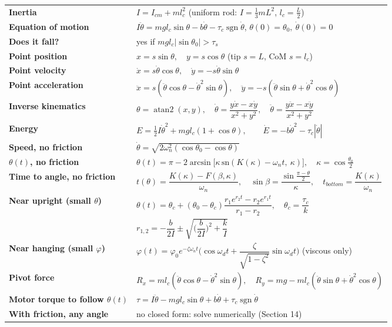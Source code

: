 \documentclass[11pt]{article}
\newcommand{\sgn}{\operatorname{sgn}}
\begin{document}
\begin{tabular}{@{}>{\raggedright\arraybackslash}p{1.35in}l@{}}
\textbf{Inertia} & $I = I_{cm} + m l_c^2$ \qquad (uniform rod: $I=\tfrac13 mL^2$, $l_c=\tfrac L2$)\\
\textbf{Equation of motion} & $I\ddot\theta = m g l_c\sin\theta - b\dot\theta - \tau_c\sgn\dot\theta$, \quad $\theta(0)=\theta_0,\ \dot\theta(0)=0$\\
\textbf{Does it fall?} & yes if $m g l_c|\sin\theta_0| > \tau_s$\\
\textbf{Point position} & $x = s\sin\theta,\quad y = s\cos\theta$ \qquad (tip $s=L$, CoM $s=l_c$)\\
\textbf{Point velocity} & $\dot x = s\dot\theta\cos\theta,\quad \dot y = -s\dot\theta\sin\theta$\\
\textbf{Point acceleration} & $\ddot x = s(\ddot\theta\cos\theta-\dot\theta^2\sin\theta),\quad \ddot y = -s(\ddot\theta\sin\theta+\dot\theta^2\cos\theta)$\\
\textbf{Inverse kinematics} & $\theta=\operatorname{atan2}(x,y),\quad \dot\theta=\dfrac{y\dot x-x\dot y}{x^2+y^2},\quad \ddot\theta=\dfrac{y\ddot x-x\ddot y}{x^2+y^2}$\\
\textbf{Energy} & $E=\tfrac12 I\dot\theta^2+m g l_c(1+\cos\theta),\qquad \dot E = -b\dot\theta^2-\tau_c|\dot\theta|$\\
\textbf{Speed, no friction} & $\dot\theta=\sqrt{2\omega_n^2(\cos\theta_0-\cos\theta)}$\\
\textbf{$\theta(t)$, no friction} & $\theta(t)=\pi-2\arcsin\!\big[\kappa\,\mathrm{sn}(K(\kappa)-\omega_n t,\ \kappa)\big],\quad \kappa=\cos\tfrac{\theta_0}{2}$\\
\textbf{Time to angle, no friction} & $t(\theta)=\dfrac{K(\kappa)-F(\beta,\kappa)}{\omega_n},\quad \sin\beta=\dfrac{\sin\frac{\pi-\theta}{2}}{\kappa},\quad t_{bottom}=\dfrac{K(\kappa)}{\omega_n}$\\
\textbf{Near upright (small $\theta$)} & $\theta(t)=\theta_c+(\theta_0-\theta_c)\dfrac{r_1e^{r_2t}-r_2e^{r_1t}}{r_1-r_2},\quad \theta_c=\dfrac{\tau_c}{k}$\\
 & $r_{1,2}=-\dfrac{b}{2I}\pm\sqrt{\Big(\dfrac{b}{2I}\Big)^2+\dfrac{k}{I}}$\\
\textbf{Near hanging (small $\varphi$)} & $\varphi(t)=\varphi_0e^{-\zeta\omega_nt}\Big(\cos\omega_dt+\dfrac{\zeta}{\sqrt{1-\zeta^2}}\sin\omega_dt\Big)$ \quad (viscous only)\\
\textbf{Pivot force} & $R_x=m l_c(\ddot\theta\cos\theta-\dot\theta^2\sin\theta),\quad R_y=m g-m l_c(\ddot\theta\sin\theta+\dot\theta^2\cos\theta)$\\
\textbf{Motor torque to follow $\theta(t)$} & $\tau=I\ddot\theta-m g l_c\sin\theta+b\dot\theta+\tau_c\sgn\dot\theta$\\
\textbf{With friction, any angle} & no closed form: solve numerically (Section 14)\\
\end{tabular}
\renewcommand{\arraystretch}{1}
\end{document}
